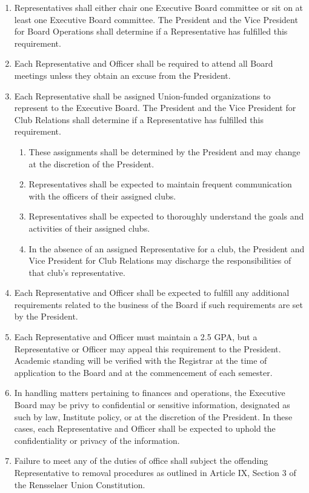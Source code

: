 \documentclass{uniondoc}
\begin{document}
\begin{enumerate}
\item Representatives shall either chair one Executive Board committee or sit on at least one Executive Board committee. The President and the Vice President for Board Operations shall determine if a Representative has fulfilled this requirement.
\item Each Representative and Officer shall be required to attend all Board meetings unless they obtain an excuse from the President.
\item Each Representative shall be assigned Union-funded organizations to represent to the Executive Board. The President and the Vice President for Club Relations shall determine if a Representative has fulfilled this requirement.
  \begin{enumerate}
  \item These assignments shall be determined by the President and may change at the discretion of the President.
  \item Representatives shall be expected to maintain frequent communication with the officers of their assigned clubs.
  \item Representatives shall be expected to thoroughly understand the goals and activities of their assigned clubs.
  \item In the absence of an assigned Representative for a club, the President and Vice President for Club Relations may discharge the responsibilities of that club’s representative.
  \end{enumerate}
\item Each Representative and Officer shall be expected to fulfill any additional requirements related to the business of the Board if such requirements are set by the President.
\item Each Representative and Officer must maintain a 2.5 GPA, but a Representative or Officer may appeal this requirement to the President. Academic standing will be verified with the Registrar at the time of application to the Board and at the commencement of each semester.
\item In handling matters pertaining to finances and operations, the Executive Board may be privy to confidential or sensitive information, designated as such by law, Institute policy, or at the discretion of the President. In these cases, each Representative and Officer shall be expected to uphold the confidentiality or privacy of the information.
\item Failure to meet any of the duties of office shall subject the offending Representative to removal procedures as outlined in Article IX, Section 3 of the Rensselaer Union Constitution.
\end{enumerate}
\end{document}
